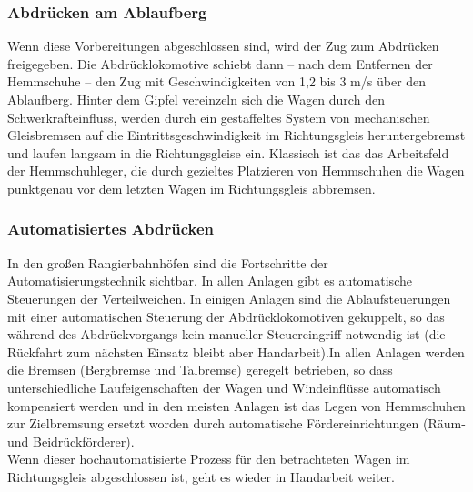 \subsubsection{Abdrücken am Ablaufberg}
Wenn diese Vorbereitungen abgeschlossen sind, wird der Zug zum Abdrücken freigegeben. Die Abdrücklokomotive schiebt dann -- nach dem Entfernen der Hemmschuhe -- den Zug mit Geschwindigkeiten von 1,2 bis 3 m/s %
über den Ablaufberg. Hinter dem Gipfel vereinzeln sich die Wagen durch den Schwerkrafteinfluss, werden durch ein gestaffeltes System von mechanischen Gleisbremsen auf die Eintrittsgeschwindigkeit im Richtungsgleis heruntergebremst und laufen langsam in die Richtungsgleise ein.  Klassisch ist das das Arbeitsfeld der Hemmschuhleger, die durch gezieltes Platzieren von Hemmschuhen die Wagen punktgenau vor dem letzten Wagen im Richtungsgleis abbremsen.
\subsubsection{Automatisiertes Abdrücken}
In den großen Rangierbahnhöfen sind die Fortschritte der Automatisierungstechnik sichtbar. In allen Anlagen gibt es automatische Steuerungen der Verteilweichen. In einigen Anlagen sind die Ablaufsteuerungen mit einer automatischen Steuerung der Abdrücklokomotiven gekuppelt, so das während des Abdrückvorgangs kein manueller Steuereingriff notwendig ist (die Rückfahrt zum nächsten Einsatz bleibt aber Handarbeit).In allen Anlagen werden die Bremsen (Bergbremse und Talbremse) geregelt betrieben, so dass unterschiedliche Laufeigenschaften der Wagen und Windeinflüsse automatisch kompensiert werden und in den meisten Anlagen ist das Legen von Hemmschuhen zur Zielbremsung ersetzt worden durch automatische Fördereinrichtungen (Räum- und Beidrückförderer).\\
Wenn dieser hochautomatisierte Prozess für den betrachteten Wagen im Richtungsgleis abgeschlossen ist, geht es wieder in Handarbeit weiter.
